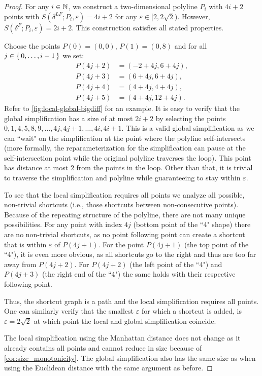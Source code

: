 \begin{proof}
	For any \(i \in \mathbb{N}\), we construct a two-dimensional polyline \(P_i\) with \(4 i + 2\) points with \(S(\delta^{LF}; P_i, \varepsilon) = 4i + 2\) for any \(\varepsilon \in [2, 2\sqrt{2})\). However, \(S(\delta^F; P_i, \varepsilon) = 2i + 2\). This construction satisfies all stated properties. 

	Choose the points \(P(0) = (0,0)\), \(P(1) = (0, 8)\) and for all \(j \in \set{0,\dots, i-1}\) we set:
	\begin{align*}
		P(4j+2) &= (-2 + 4j, 6 + 4j), \\
		P(4j+3) &= (6 + 4j, 6 + 4j), \\
		P(4j+4) &= (4 + 4j, 4 + 4j), \\
		P(4j+5) &= (4 + 4j, 12 + 4j).
	\end{align*}
	Refer to \cref{fig:local-global-bigdiff} for an example. It is easy to verify that the global simplification has a size of at most \(2i + 2\) by selecting the points \(0,1, 4, 5, 8, 9, \dots, 4j, 4j + 1, \dots, 4i, 4i+1\). This is a valid global simplification as we can ``wait" on the simplification at the point where the polyline self-intersects (more formally, the reparameterization for the simplification can pause at the self-intersection point while the original polyline traverses the loop). This point has distance at most \(2\) from the points in the loop. Other than that, it is trivial to traverse the simplification and polyline while guaranteeing to stay within \(\varepsilon\). 

	To see that the local simplification requires all points we analyze all possible, non-trivial shortcuts (i.e., those shortcuts between non-consecutive points). Because of the repeating structure of the polyline, there are not many unique possibilities. For any point with index \(4j\) (bottom point of the ``4" shape) there are no non-trivial shortcuts, as no point following point can create a shortcut that is within \(\varepsilon\) of \(P(4j+1)\). For the point \(P(4j+1)\) (the top point of the ``4"), it is even more obvious, as all shortcuts go to the right and thus are too far away from \(P(4j+2)\). For \(P(4j+2)\) (the left point of the ``4") and \(P(4j+3)\) (the right end of the ``4") the same holds with their respective following point.

	Thus, the shortcut graph is a path and the local simplification requires all points. One can similarly verify that the smallest \(\varepsilon\) for which a shortcut is added, is \(\varepsilon = 2\sqrt2\) at which point the local and global simplification coincide. 

	The local simplification using the Manhattan distance does not change as it already contains all points and cannot reduce in size because of \cref{cor:size_monotonicity}. The global simplification also has the same size as when using the Euclidean distance with the same argument as before.
\end{proof}

